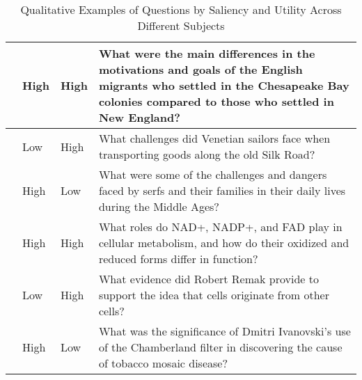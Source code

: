 \begin{table}[h]
{\begin{tabular}{|>{\centering}m{3cm}|>{\centering}m{2cm}|>{\centering}m{2cm}|p{10cm}|}
        \multirow{3}{*}{U.S. History} 
        & High & High & What were the main differences in the motivations and goals of the English migrants who settled in the Chesapeake Bay colonies compared to those who settled in New England? \\ \cline{2-4}
        & Low & High & What challenges did Venetian sailors face when transporting goods along the old Silk Road? \\ \cline{2-4}
        & High & Low & What were some of the challenges and dangers faced by serfs and their families in their daily lives during the Middle Ages? \\ \hline
        \multirow{3}{*}{Microbiology} 
        & High & High & What roles do NAD+, NADP+, and FAD play in cellular metabolism, and how do their oxidized and reduced forms differ in function? \\ \cline{2-4}
        & Low & High & What evidence did Robert Remak provide to support the idea that cells originate from other cells? \\ \cline{2-4}
        & High & Low & What was the significance of Dmitri Ivanovski’s use of the Chamberland filter in discovering the cause of tobacco mosaic disease? \\ \hline
    \end{tabular}%
    }
    \caption{Qualitative Examples of Questions by Saliency and Utility Across Different Subjects}
    \label{tab:utility_analysis}
\end{table}

